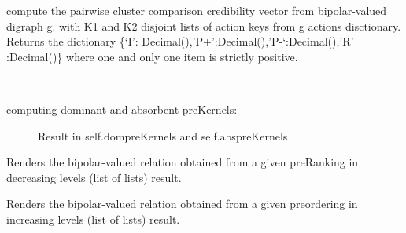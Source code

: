 \documentclass[letterpaper,10pt,english]{sphinxmanual}
\begin{document}
\begin{fulllineitems}

\begin{fulllineitems}
\label{techDoc:digraphs.Digraph.computePairwiseClusterComparison}
compute the pairwise cluster comparison credibility vector
from bipolar-valued digraph g. with K1 and K2 disjoint
lists of action keys from g actions disctionary.
Returns the dictionary
\{`I': Decimal(),'P+':Decimal(),'P-`:Decimal(),'R' :Decimal()\}
where one and only one item is strictly positive.

\end{fulllineitems}


\begin{fulllineitems}
\label{techDoc:digraphs.Digraph.computePreKernels}~\begin{description}
\item[{computing dominant and absorbent preKernels:}] \leavevmode
Result in self.dompreKernels and self.abspreKernels

\end{description}

\end{fulllineitems}


\begin{fulllineitems}
\label{techDoc:digraphs.Digraph.computePreRankingRelation}
Renders the bipolar-valued relation obtained from
a given preRanking in decreasing levels (list of lists) result.

\end{fulllineitems}


\begin{fulllineitems}
\label{techDoc:digraphs.Digraph.computePreorderRelation}
Renders the bipolar-valued relation obtained from
a given preordering in increasing levels (list of lists) result.


\end{fulllineitems}
\end{fulllineitems}
\end{document}
